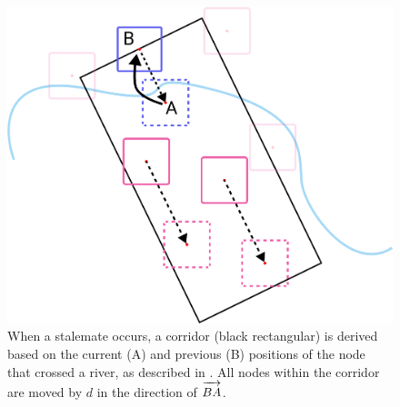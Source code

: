 {
\begin{figure}[tb!]
    \centering
    \includegraphics[width=\columnwidth]{figure/corridor.png}
    \caption{When a stalemate occurs, a corridor (black rectangular) is derived based on the current (A) and previous (B) positions of the node that crossed a river, as described in . All nodes within the corridor are moved by $ d $ in the direction of $ \protect\overrightarrow{BA\strut} $. }
    \label{fig:corridor}
\end{figure}
}


